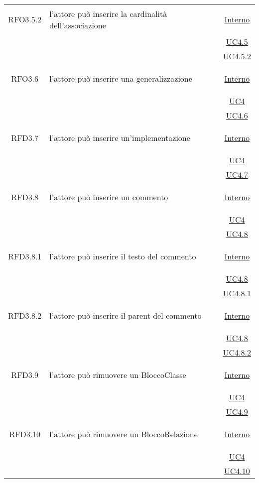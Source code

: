 \begin{longtable}{|c|>{\centering}m{7cm}|c|}
\hypertarget{RFO3.5.2}{RFO3.5.2} & l'attore può inserire la cardinalità dell'associazione &  \hyperlink{Interno}{Interno}\\
& &\hyperref[UC4.5]{UC4.5}\\
& &\hyperref[UC4.5.2]{UC4.5.2}\\ \hline

\hypertarget{RFO3.6}{RFO3.6} & l'attore può inserire una generalizzazione &  \hyperlink{Interno}{Interno}\\
& &\hyperref[UC4]{UC4}\\
& &\hyperref[UC4.6]{UC4.6}\\ \hline

\hypertarget{RFD3.7}{RFD3.7} & l'attore può inserire un'implementazione &  \hyperlink{Interno}{Interno}\\
& &\hyperref[UC4]{UC4}\\
& &\hyperref[UC4.7]{UC4.7}\\ \hline

\hypertarget{RFD3.8}{RFD3.8} & l'attore può inserire un commento &  \hyperlink{Interno}{Interno}\\
& &\hyperref[UC4]{UC4}\\
& &\hyperref[UC4.8]{UC4.8}\\ \hline

\hypertarget{RFD3.8.1}{RFD3.8.1} & l'attore può inserire il testo del commento &  \hyperlink{Interno}{Interno}\\
& &\hyperref[UC4.8]{UC4.8}\\
& &\hyperref[UC4.8.1]{UC4.8.1}\\ \hline

\hypertarget{RFD3.8.2}{RFD3.8.2} & l'attore può inserire il parent del commento &  \hyperlink{Interno}{Interno}\\
& &\hyperref[UC4.8]{UC4.8}\\
& &\hyperref[UC4.8.2]{UC4.8.2}\\ \hline

\hypertarget{RFD3.9}{RFD3.9} & l'attore può rimuovere un BloccoClasse &  \hyperlink{Interno}{Interno}\\
& &\hyperref[UC4]{UC4}\\
& &\hyperref[UC4.9]{UC4.9}\\ \hline

\hypertarget{RFD3.10}{RFD3.10} & l'attore può rimuovere un BloccoRelazione &  \hyperlink{Interno}{Interno}\\
& &\hyperref[UC4]{UC4}\\
& &\hyperref[UC4.10]{UC4.10}\\ \hline


\end{longtable}
